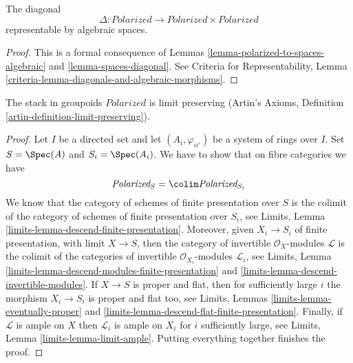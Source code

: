 \begin{lemma}
\label{lemma-polarized-diagonal}
The diagonal
$$
\Delta : \textit{Polarized} \longrightarrow
\textit{Polarized} \times \textit{Polarized}
$$
representable by algebraic spaces.
\end{lemma}

\begin{proof}
This is a formal consequence of
Lemmas \ref{lemma-polarized-to-spaces-algebraic} and
\ref{lemma-spaces-diagonal}.
See Criteria for Representability, Lemma
\ref{criteria-lemma-diagonals-and-algebraic-morphisms}.
\end{proof}

\begin{lemma}
\label{lemma-polarized-limits}
The stack in groupoids $\textit{Polarized}$ is limit preserving
(Artin's Axioms, Definition \ref{artin-definition-limit-preserving}).
\end{lemma}

\begin{proof}
Let $I$ be a directed set and let $(A_i, \varphi_{ii'})$
be a system of rings over $I$. Set $S = \Spec(A)$ and
$S_i = \Spec(A_i)$. We have to show that on fibre categories we have
$$
\textit{Polarized}_S = \colim \textit{Polarized}_{S_i}
$$
We know that the category of schemes of finite presentation over
$S$ is the colimit of the category of schemes of finite presentation
over $S_i$, see
Limits, Lemma \ref{limits-lemma-descend-finite-presentation}.
Moreover, given $X_i \to S_i$ of finite presentation, with
limit $X \to S$, then the category of invertible
$\mathcal{O}_X$-modules $\mathcal{L}$ is the colimit of the categories
of invertible $\mathcal{O}_{X_i}$-modules $\mathcal{L}_i$, see
Limits, Lemma \ref{limits-lemma-descend-modules-finite-presentation} and
\ref{limits-lemma-descend-invertible-modules}.
If $X \to S$ is proper and flat, then for sufficiently large
$i$ the morphism $X_i \to S_i$ is proper and flat too, see
Limits, Lemmas \ref{limits-lemma-eventually-proper} and
\ref{limits-lemma-descend-flat-finite-presentation}.
Finally, if $\mathcal{L}$ is ample on $X$
then $\mathcal{L}_i$ is ample on $X_i$ for
$i$ sufficiently large, see
Limits, Lemma \ref{limits-lemma-limit-ample}.
Putting everything together finishes the proof.
\end{proof}
















